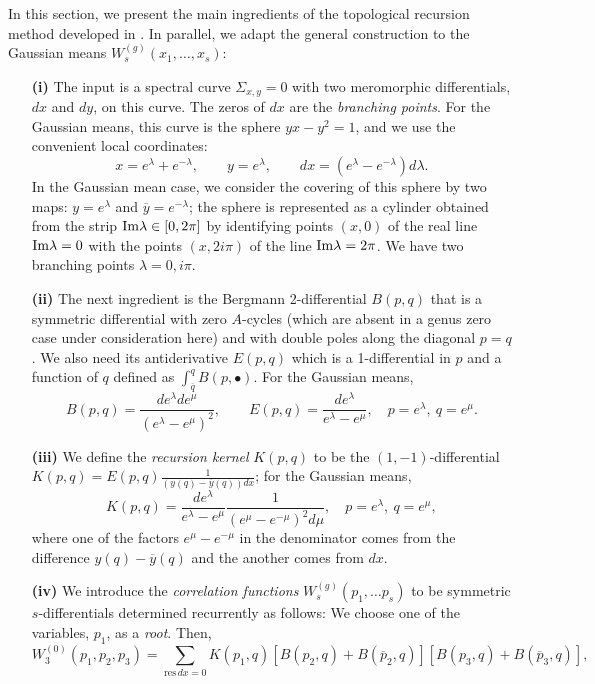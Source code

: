 \documentclass[11pt]{article}
\def\be{\begin{equation}}
\def\ee{\end{equation}}
\def\Im{{\rm Im}}
\theoremstyle{plain}
\theoremstyle{definition}
\begin{document}
In this section, we present the main ingredients of the topological recursion method developed in \cite{Ey,ChEy,CEO,EOrInv}. In parallel, we adapt the
general construction to the Gaussian means $W^{(g)}_s(x_1,\dots,x_s)$:
\begin{itemize}
\item[{\bf(i)}] The input is a spectral curve $\Sigma_{x,y}=0$ with two meromorphic differentials, $dx$ and $dy$, on this curve. The zeros of $dx$ are the
\emph{branching points}. For the Gaussian means, this curve is the sphere $yx-y^2=1$, and we use the convenient 
local coordinates:
\be
x=e^{\lambda}+e^{-\lambda}, \qquad y=e^{\lambda},\qquad dx=(e^{\lambda}-e^{-\lambda})d\lambda.
\label{XY}
\ee
In the Gaussian mean case, we 
consider the covering of this sphere by two maps: $y=e^{\lambda}$ and $\overline y=e^{-\lambda}$; the sphere is represented as a cylinder
obtained from the strip $\Im \lambda\in [0,2\pi]$ by identifying points $(x,0)$ of the real line $\Im\lambda=0$
with the points $(x,2i\pi)$ of the line $\Im\lambda=2\pi$. We have two branching points
$\lambda=0,i\pi$.
\item[{\bf(ii)}]  The next ingredient is the Bergmann 2-differential $B(p,q)$ that is a symmetric differential with zero $A$-cycles (which are absent in a genus zero case under consideration here) and
with double poles along the diagonal $p=q$. We also need its antiderivative $E(p,q)$ which is a 1-differential in $p$ and a function of $q$ defined 
as $\int_{\overline q}^q B(p,\bullet)$. For the Gaussian means, 
\be
B(p,q)=\frac{d e^\lambda d e^{\mu}}{(e^\lambda-e^\mu)^2}, \qquad E(p,q)=\frac{d e^\lambda}{e^\lambda-e^\mu}, \quad p=e^\lambda,\ 
q=e^\mu.
\label{Bpq}
\ee
\item[{\bf(iii)}]
We define the \emph{recursion kernel} $K(p,q)$ to be the $(1,-1)$-differential $K(p,q)=E(p,q)\frac{1}{(y(q)-\overline y(q))dx}$; 
for the Gaussian means,
\be
K(p,q)=\frac{d e^\lambda}{e^\lambda-e^\mu}\frac{1}{(e^\mu-e^{-\mu})^2 d\mu}, \quad p=e^\lambda,\ 
q=e^\mu,
\label{Kpq}
\ee
where one of the factors $e^\mu-e^{-\mu}$ in the denominator comes from the difference $y(q)-\overline y(q)$ and the another comes
from $dx$. 
\item[{\bf(iv)}]
We introduce the \emph{correlation functions} $W^{(g)}_s(p_1,\dots p_s)$ to be symmetric $s$-differentials determined recurrently as follows:
We choose one of the variables, $p_1$, as a \emph{root}. Then,
\be
W^{(0)}_3(p_1,p_2,p_3)=\sum_{\mathrm{res\,}dx=0} K(p_1,q)[B(p_2,q)+B(\overline p_2,q)][B(p_3,q)+B(\overline p_3,q)],
\label{W03}
\ee

\end{itemize}
\end{document}
